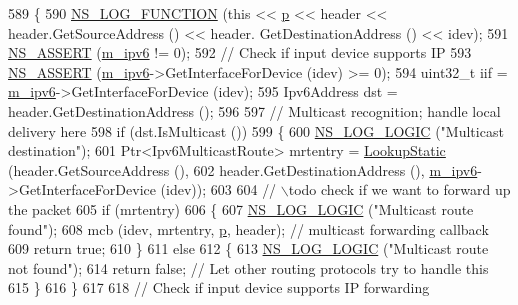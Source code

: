 \begin{DoxyCode}
589 \{
590   \hyperlink{log-macros-disabled_8h_a90b90d5bad1f39cb1b64923ea94c0761}{NS\_LOG\_FUNCTION} (\textcolor{keyword}{this} << \hyperlink{lte__link__budget_8m_ac9de518908a968428863f829398a4e62}{p} << header << header.GetSourceAddress () << header.
      GetDestinationAddress () << idev);
591   \hyperlink{assert_8h_a6dccdb0de9b252f60088ce281c49d052}{NS\_ASSERT} (\hyperlink{classns3_1_1Ipv6StaticRouting_aeb0293ac3549a6ca0ba7674d35646fc8}{m\_ipv6} != 0);
592   \textcolor{comment}{// Check if input device supports IP}
593   \hyperlink{assert_8h_a6dccdb0de9b252f60088ce281c49d052}{NS\_ASSERT} (\hyperlink{classns3_1_1Ipv6StaticRouting_aeb0293ac3549a6ca0ba7674d35646fc8}{m\_ipv6}->GetInterfaceForDevice (idev) >= 0);
594   uint32\_t iif = \hyperlink{classns3_1_1Ipv6StaticRouting_aeb0293ac3549a6ca0ba7674d35646fc8}{m\_ipv6}->GetInterfaceForDevice (idev);
595   Ipv6Address dst = header.GetDestinationAddress ();
596 
597   \textcolor{comment}{// Multicast recognition; handle local delivery here}
598   \textcolor{keywordflow}{if} (dst.IsMulticast ())
599     \{
600       \hyperlink{group__logging_ga88acd260151caf2db9c0fc84997f45ce}{NS\_LOG\_LOGIC} (\textcolor{stringliteral}{"Multicast destination"});
601       Ptr<Ipv6MulticastRoute> mrtentry = \hyperlink{classns3_1_1Ipv6StaticRouting_a53cafb0907cefabca6894c9d4dc6c154}{LookupStatic} (header.GetSourceAddress (),
602                                                        header.GetDestinationAddress (), 
      \hyperlink{classns3_1_1Ipv6StaticRouting_aeb0293ac3549a6ca0ba7674d35646fc8}{m\_ipv6}->GetInterfaceForDevice (idev));
603 
604       \textcolor{comment}{// \(\backslash\)todo check if we want to forward up the packet}
605       \textcolor{keywordflow}{if} (mrtentry)
606         \{
607           \hyperlink{group__logging_ga88acd260151caf2db9c0fc84997f45ce}{NS\_LOG\_LOGIC} (\textcolor{stringliteral}{"Multicast route found"});
608           mcb (idev, mrtentry, \hyperlink{lte__link__budget_8m_ac9de518908a968428863f829398a4e62}{p}, header); \textcolor{comment}{// multicast forwarding callback}
609           \textcolor{keywordflow}{return} \textcolor{keyword}{true};
610         \}
611       \textcolor{keywordflow}{else}
612         \{
613           \hyperlink{group__logging_ga88acd260151caf2db9c0fc84997f45ce}{NS\_LOG\_LOGIC} (\textcolor{stringliteral}{"Multicast route not found"});
614           \textcolor{keywordflow}{return} \textcolor{keyword}{false}; \textcolor{comment}{// Let other routing protocols try to handle this}
615         \}
616     \}
617 
618   \textcolor{comment}{// Check if input device supports IP forwarding}

\end{DoxyCode}
